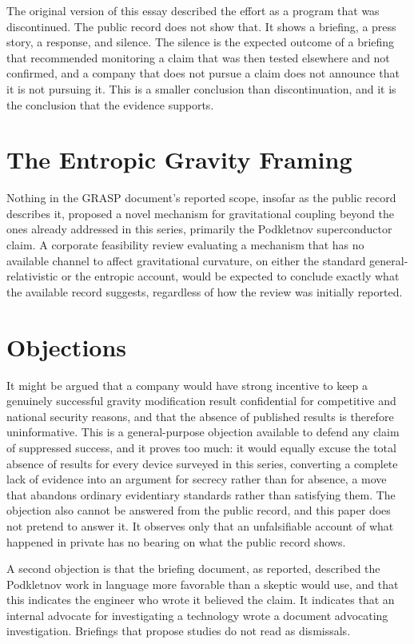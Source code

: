 \documentclass[11pt]{article}
\begin{document}
The original version of this essay described the effort as a program that was discontinued. The public record does not show that. It shows a briefing, a press story, a response, and silence. The silence is the expected outcome of a briefing that recommended monitoring a claim that was then tested elsewhere and not confirmed, and a company that does not pursue a claim does not announce that it is not pursuing it. This is a smaller conclusion than discontinuation, and it is the conclusion that the evidence supports.

\section{The Entropic Gravity Framing}

Nothing in the GRASP document's reported scope, insofar as the public record describes it, proposed a novel mechanism for gravitational coupling beyond the ones already addressed in this series, primarily the Podkletnov superconductor claim. A corporate feasibility review evaluating a mechanism that has no available channel to affect gravitational curvature, on either the standard general-relativistic or the entropic account, would be expected to conclude exactly what the available record suggests, regardless of how the review was initially reported.

\section{Objections}

It might be argued that a company would have strong incentive to keep a genuinely successful gravity modification result confidential for competitive and national security reasons, and that the absence of published results is therefore uninformative. This is a general-purpose objection available to defend any claim of suppressed success, and it proves too much: it would equally excuse the total absence of results for every device surveyed in this series, converting a complete lack of evidence into an argument for secrecy rather than for absence, a move that abandons ordinary evidentiary standards rather than satisfying them. The objection also cannot be answered from the public record, and this paper does not pretend to answer it. It observes only that an unfalsifiable account of what happened in private has no bearing on what the public record shows.

A second objection is that the briefing document, as reported, described the Podkletnov work in language more favorable than a skeptic would use, and that this indicates the engineer who wrote it believed the claim. It indicates that an internal advocate for investigating a technology wrote a document advocating investigation. Briefings that propose studies do not read as dismissals.
\end{document}
